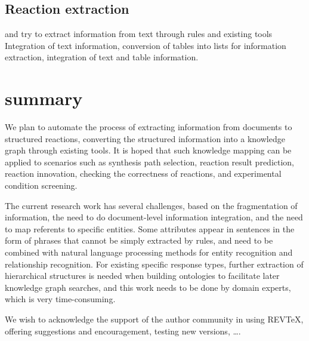 \documentclass[%
 aip,
 jmp,%
 amsmath,amssymb,
 reprint,%
]{revtex4-2}
\begin{document}
\subsection{Reaction extraction}
and try to extract information from text through rules and existing tools
Integration of text information, conversion of tables into lists for information extraction, integration of text and table information.

\section{summary}
We plan to automate the process of extracting information from documents to structured reactions, converting the structured information 
into a knowledge graph through existing tools. It is hoped that such knowledge mapping can be applied to scenarios such as synthesis path
selection, reaction result prediction, reaction innovation, checking the correctness of reactions, and experimental condition screening.

The current research work has several challenges, based on the fragmentation of information, the need to do document-level information 
integration, and the need to map referents to specific entities. Some attributes appear in sentences in the form of phrases that cannot 
be simply extracted by rules, and need to be combined with natural language processing methods for entity recognition and relationship 
recognition. For existing specific response types, further extraction of hierarchical structures is needed when building ontologies to 
facilitate later knowledge graph searches, and this work needs to be done by domain experts, which is very time-consuming.

\begin{acknowledgments}
We wish to acknowledge the support of the author community in using
REV\TeX{}, offering suggestions and encouragement, testing new versions,
\dots.
\end{acknowledgments}

\nocite{*}
\end{document}
